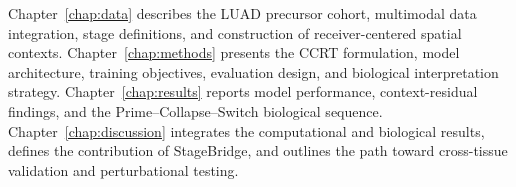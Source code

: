 Chapter~\ref{chap:data} describes the LUAD precursor cohort, multimodal data integration, stage definitions, and construction of receiver-centered spatial contexts. Chapter~\ref{chap:methods} presents the CCRT formulation, model architecture, training objectives, evaluation design, and biological interpretation strategy. Chapter~\ref{chap:results} reports model performance, context-residual findings, and the Prime--Collapse--Switch biological sequence. Chapter~\ref{chap:discussion} integrates the computational and biological results, defines the contribution of StageBridge, and outlines the path toward cross-tissue validation and perturbational testing.

